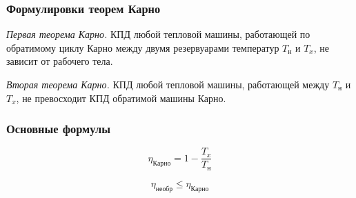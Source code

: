 \documentclass[12pt, a4paper]{article}
\begin{document}
\subsubsection*{Формулировки теорем Карно}

\textit{Первая теорема Карно.} КПД любой тепловой машины, работающей по обратимому циклу Карно между двумя резервуарами температур $T_{\text{н}}$ и $T_x$, не зависит от рабочего тела.

\textit{Вторая теорема Карно.} КПД любой тепловой машины, работающей между $T_{\text{н}}$ и $T_x$, не превосходит КПД обратимой машины Карно.

\subsubsection*{Основные формулы}

\[
\eta_{\text{Карно}}=1-\frac{T_x}{T_{\text{н}}}
\]

\[
\eta_{\text{необр}}\le \eta_{\text{Карно}}
\]
\end{document}
